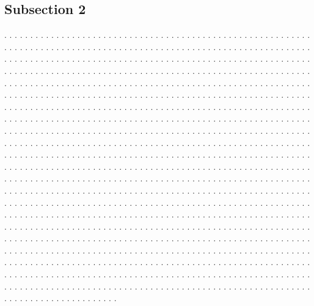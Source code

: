\documentclass[twocolumn]{revtex4}
\begin{document}
\subsection{Subsection 2}

. . . . . . . . . . . . . . . . . . . . . . . . . . . . . . . . . . . . . . . .
. . . . . . . . . . . . . . . . . . . . . . . . . . . . . . . . . . . . . . . .
. . . . . . . . . . . . . . . . . . . . . . . . . . . . . . . . . . . . . . . .
. . . . . . . . . . . . . . . . . . . . . . . . . . . . . . . . . . . . . . . .
. . . . . . . . . . . . . . . . . . . . . . . . . . . . . . . . . . . . . . . .
. . . . . . . . . . . . . . . . . . . . . . . . . . . . . . . . . . . . . . . .
. . . . . . . . . . . . . . . . . . . . . . . . . . . . . . . . . . . . . . . .
. . . . . . . . . . . . . . . . . . . . . . . . . . . . . . . . . . . . . . . .
. . . . . . . . . . . . . . . . . . . . . . . . . . . . . . . . . . . . . . . .
. . . . . . . . . . . . . . . . . . . . . . . . . . . . . . . . . . . . . . . .
. . . . . . . . . . . . . . . . . . . . . . . . . . . . . . . . . . . . . . . .
. . . . . . . . . . . . . . . . . . . . . . . . . . . . . . . . . . . . . . . .
. . . . . . . . . . . . . . . . . . . . . . . . . . . . . . . . . . . . . . . .
. . . . . . . . . . . . . . . . . . . . . . . . . . . . . . . . . . . . . . . .
. . . . . . . . . . . . . . . . . . . . . . . . . . . . . . . . . . . . . . . .
. . . . . . . . . . . . . . . . . . . . . . . . . . . . . . . . . . . . . . . .
. . . . . . . . . . . . . . . . . . . . . . . . . . . . . . . . . . . . . . . .
. . . . . . . . . . . . . . . . . . . . . . . . . . . . . . . . . . . . . . . .
. . . . . . . . . . . . . . . . . . . . . . . . . . . . . . . . . . . . . . . .
. . . . . . . . . . . . . . . . . . . . . . . . . . . . . . . . . . . . . . . .
. . . . . . . . . . . . . . . . . . . . . . . . . . . . . . . . . . . . . . . .
. . . . . . . . . . . . . . . . . . . . . . . . . . . . . . . . . . . . . . . .
. . . . . . . . . . . . . . . . . . . . . . . . . . . . . . . . . . . . . . . .
. . . . . . . . . . . . . . . . . . . . . . . . . . . . . . . . . . . . . . . .
. . . . . . . . . . . . . . . . . . . . . . . . . . . . . . . . . . . . . . . .
. . . . . . . . . . . . . . . . . . . . . . . . . . . . . . . . . . . . . . . .
. . . . . . . . . . . . . . . . . . . . . . . . . . . . . . . . . . . . . . . .
. . . . . . . . . . . . . . . . . . . . . . . . . . . . . . . . . . . . . . . .
. . . . . . . . . . . . . . . . . . . . . . . . . . . . . . . . . . . . . . . .
. . . . . . . . . . . . . . . . . . . . . . . . . . . . . . . . . . . . . . . .
. . . . . . . . . . . . . . . . . . . . . . . . . . . . . . . . . . . . . . . .
. . . . . . . . . . . . . . . . . . . . . . . . . . . . . . . . . . . . . . . .
. . . . . . . . . . . . . . . . . . . . . . . . . . . . . . . . . . . . . . . .
\end{document}
